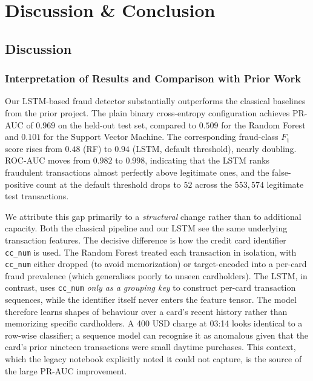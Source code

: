 \documentclass[oneside,12pt,parskip=half,american,numbers=noenddot]{scrreprt}
\begin{document}
\pagebreak
\chapter{Discussion \& Conclusion}

\section{Discussion}

\subsection{Interpretation of Results and Comparison with Prior Work}

Our LSTM-based fraud detector substantially outperforms the classical baselines from the prior project. The plain binary cross-entropy configuration achieves PR-AUC of $0.969$ on the held-out test set, compared to $0.509$ for the Random Forest and $0.101$ for the Support Vector Machine. The corresponding fraud-class $F_1$ score rises from $0.48$ (RF) to $0.94$ (LSTM, default threshold), nearly doubling. ROC-AUC moves from $0.982$ to $0.998$, indicating that the LSTM ranks fraudulent transactions almost perfectly above legitimate ones, and the false-positive count at the default threshold drops to $52$ across the $553{,}574$ legitimate test transactions.

We attribute this gap primarily to a \emph{structural} change rather than to additional capacity. Both the classical pipeline and our LSTM see the same underlying transaction features. The decisive difference is how the credit card identifier \texttt{cc\_num} is used. The Random Forest treated each transaction in isolation, with \texttt{cc\_num} either dropped (to avoid memorization) or target-encoded into a per-card fraud prevalence (which generalises poorly to unseen cardholders). The LSTM, in contrast, uses \texttt{cc\_num} \emph{only as a grouping key} to construct per-card transaction sequences, while the identifier itself never enters the feature tensor. The model therefore learns shapes of behaviour over a card's recent history rather than memorizing specific cardholders. A 400 USD charge at 03:14 looks identical to a row-wise classifier; a sequence model can recognise it as anomalous given that the card's prior nineteen transactions were small daytime purchases. This context, which the legacy notebook explicitly noted it could not capture, is the source of the large PR-AUC improvement.
\end{document}
